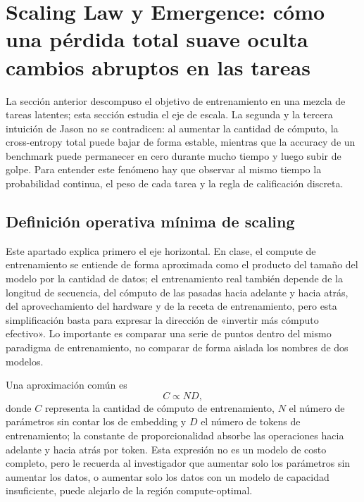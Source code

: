 \section{Scaling Law y Emergence: cómo una pérdida total suave oculta cambios abruptos en las tareas}

La sección anterior descompuso el objetivo de entrenamiento en una mezcla de tareas latentes; esta sección estudia el eje de escala. La segunda y la tercera intuición de Jason no se contradicen: al aumentar la cantidad de cómputo, la cross-entropy total puede bajar de forma estable, mientras que la accuracy de un benchmark puede permanecer en cero durante mucho tiempo y luego subir de golpe. Para entender este fenómeno hay que observar al mismo tiempo la probabilidad continua, el peso de cada tarea y la regla de calificación discreta.

\subsection{Definición operativa mínima de scaling}

Este apartado explica primero el eje horizontal. En clase, el compute de entrenamiento se entiende de forma aproximada como el producto del tamaño del modelo por la cantidad de datos; el entrenamiento real también depende de la longitud de secuencia, del cómputo de las pasadas hacia adelante y hacia atrás, del aprovechamiento del hardware y de la receta de entrenamiento, pero esta simplificación basta para expresar la dirección de «invertir más cómputo efectivo». Lo importante es comparar una serie de puntos dentro del mismo paradigma de entrenamiento, no comparar de forma aislada los nombres de dos modelos.


Una aproximación común es
\[
C\propto N D,
\]
donde $C$ representa la cantidad de cómputo de entrenamiento, $N$ el número de parámetros sin contar los de embedding y $D$ el número de tokens de entrenamiento; la constante de proporcionalidad absorbe las operaciones hacia adelante y hacia atrás por token. Esta expresión no es un modelo de costo completo, pero le recuerda al investigador que aumentar solo los parámetros sin aumentar los datos, o aumentar solo los datos con un modelo de capacidad insuficiente, puede alejarlo de la región compute-optimal.

